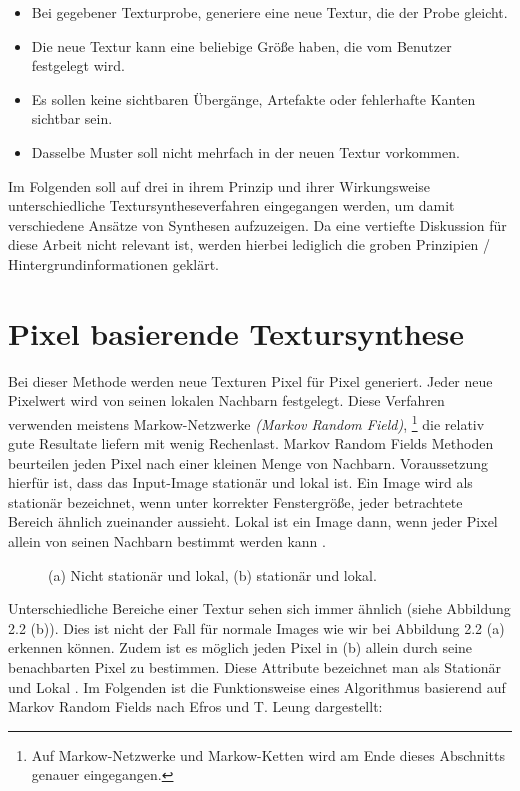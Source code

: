 \documentclass[12pt, a4paper,twoside,openany]{report} %
\begin{document}
\begin{itemize}
    \item Bei gegebener Texturprobe, generiere eine neue Textur, die der Probe gleicht.
    \item Die neue Textur kann eine beliebige Größe haben, die vom Benutzer festgelegt wird.
    \item Es sollen keine sichtbaren Übergänge, Artefakte oder fehlerhafte Kanten sichtbar sein.
    \item Dasselbe Muster soll nicht mehrfach in der neuen Textur vorkommen. \cite[S.2]{GomathiShah2009}
\end{itemize}

Im Folgenden soll auf drei in ihrem Prinzip und ihrer Wirkungsweise unterschiedliche Textursyntheseverfahren eingegangen werden,
um damit verschiedene Ansätze von Synthesen aufzuzeigen.
Da eine vertiefte Diskussion für diese Arbeit nicht relevant ist, werden hierbei lediglich die groben Prinzipien / Hintergrundinformationen geklärt.

\section{Pixel basierende Textursynthese}

Bei dieser Methode werden neue Texturen Pixel für Pixel generiert.
Jeder neue Pixelwert wird von seinen lokalen Nachbarn festgelegt.
Diese Verfahren verwenden meistens Markow-Netzwerke \textit{(Markov Random Field)},
\footnote[1]{Auf Markow-Netzwerke und Markow-Ketten wird am Ende dieses Abschnitts genauer eingegangen.}
die relativ gute Resultate liefern mit wenig Rechenlast.
Markov Random Fields Methoden beurteilen jeden Pixel nach einer kleinen Menge von Nachbarn.
Voraussetzung hierfür ist, dass das Input-Image stationär und lokal ist.
Ein Image wird als stationär bezeichnet, wenn unter korrekter Fenstergröße,
jeder betrachtete Bereich ähnlich zueinander aussieht.
Lokal ist ein Image dann, wenn jeder Pixel allein von seinen Nachbarn bestimmt werden kann \cite{GomathiShah2009}.

\begin{figure}[H]
    \centering
    \qquad
    \caption{(a) Nicht stationär und lokal, (b) stationär und lokal.}%
\end{figure}

Unterschiedliche Bereiche einer Textur sehen sich immer ähnlich {(siehe Abbildung 2.2 (b))}.
Dies ist nicht der Fall für normale Images wie wir bei Abbildung 2.2 {(a)} erkennen können.
Zudem ist es möglich jeden Pixel in {(b)} allein durch seine benachbarten Pixel zu bestimmen.
Diese Attribute bezeichnet man als Stationär und Lokal \cite{GomathiShah2009}.
Im Folgenden ist die Funktionsweise eines Algorithmus basierend auf Markov Random Fields nach Efros und T. Leung dargestellt: \cite{Efros99}
\end{document}
